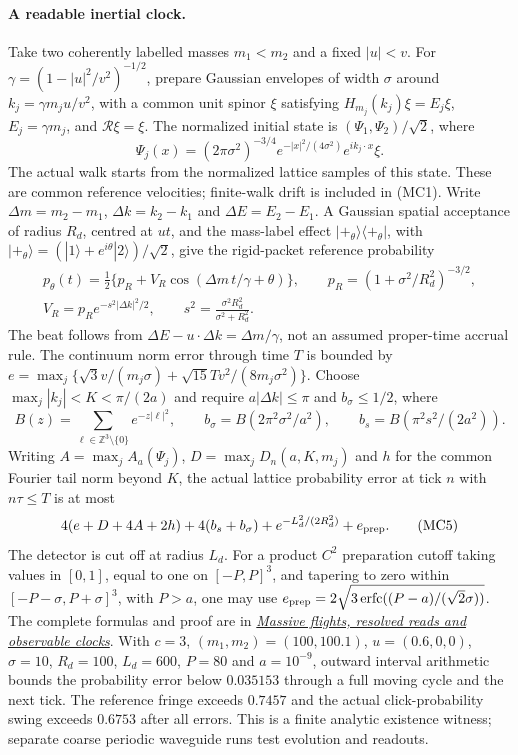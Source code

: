 \paragraph{A readable inertial clock.}
Take two coherently labelled masses $m_1<m_2$ and a fixed
$|u|<v$. For $\gamma=(1-|u|^2/v^2)^{-1/2}$, prepare Gaussian envelopes
of width $\sigma$ around $k_j=\gamma m_j u/v^2$, with a common unit spinor
$\xi$ satisfying $H_{m_j}(k_j)\xi=E_j\xi$, $E_j=\gamma m_j$, and
$\mathcal R\xi=\xi$. The normalized initial state is
$(\Psi_1,\Psi_2)/\sqrt2$, where
\[
 \Psi_j(x)=(2\pi\sigma^2)^{-3/4}
       e^{-|x|^2/(4\sigma^2)}e^{ik_j\cdot x}\xi.
\]
The actual walk starts from the normalized lattice samples of this state.
These are common reference velocities; finite-walk drift is included in
(MC1). Write $\Delta m=m_2-m_1$, $\Delta k=k_2-k_1$ and
$\Delta E=E_2-E_1$.
A Gaussian spatial acceptance of radius $R_d$, centred at $ut$, and the
mass-label effect $|+_\theta\rangle\langle+_\theta|$, with
$|+_\theta\rangle=(|1\rangle+e^{i\theta}|2\rangle)/\sqrt2$, give the
rigid-packet reference probability
\[
 \begin{gathered}
 p_\theta(t)=\tfrac12\{p_R+V_R\cos(\Delta m\,t/\gamma+\theta)\},
 \qquad p_R=(1+\sigma^2/R_d^2)^{-3/2},\\
 V_R=p_Re^{-s^2|\Delta k|^2/2},\qquad
 s^2=\frac{\sigma^2R_d^2}{\sigma^2+R_d^2}.
 \end{gathered}
 \tag{MC4}
\]
The beat follows from $\Delta E-u\cdot\Delta k=\Delta m/\gamma$,
not an assumed proper-time accrual rule. The continuum norm error through
time $T$ is bounded by
$e=\max_j\{\sqrt3v/(m_j\sigma)+\sqrt{15}Tv^2/(8m_j\sigma^2)\}$.
Choose $\max_j|k_j|<K<\pi/(2a)$ and require
$a|\Delta k|\le\pi$ and $b_\sigma\le1/2$, where
\[
 B(z)=\sum_{\ell\in\mathbb Z^3\setminus\{0\}}e^{-z|\ell|^2},
 \qquad b_\sigma=B(2\pi^2\sigma^2/a^2),\qquad
 b_s=B(\pi^2s^2/(2a^2)).
\]
Writing $A=\max_jA_a(\Psi_j)$, $D=\max_jD_n(a,K,m_j)$ and $h$ for
the common Fourier tail norm beyond $K$, the actual lattice probability
error at tick $n$ with $n\tau\le T$ is at most
\[
 4(e+D+4A+2h)+4(b_s+b_\sigma)
       +e^{-L_d^2/(2R_d^2)}+e_{\rm prep}.
 \tag{MC5}
\]
The detector is cut off at radius $L_d$. For a product $C^2$ preparation
cutoff taking values in $[0,1]$, equal to one on $[-P,P]^3$, and tapering to zero within
$[-P-\sigma,P+\sigma]^3$, with $P>a$, one may use
$e_{\rm prep}=2\sqrt{3\operatorname{erfc}((P-a)/(\sqrt2\sigma))}$.
The complete formulas and proof are in
\href{https://github.com/FloatingPragma/observer-patch-holography/blob/r2055/docs/research/MASSIVE_OPERATIONAL_CLOCKS.md}{\emph{Massive flights, resolved reads and observable clocks}}.
With $c=3$, $(m_1,m_2)=(100,100.1)$, $u=(0.6,0,0)$,
$\sigma=10$, $R_d=100$, $L_d=600$, $P=80$ and
$a=10^{-9}$, outward interval arithmetic bounds the probability error below
$0.035153$ through a full moving cycle and the next tick. The reference
fringe exceeds $0.7457$ and the actual click-probability swing exceeds
$0.6753$ after all errors. This is a finite analytic existence witness;
separate coarse periodic waveguide runs test evolution and readouts.

